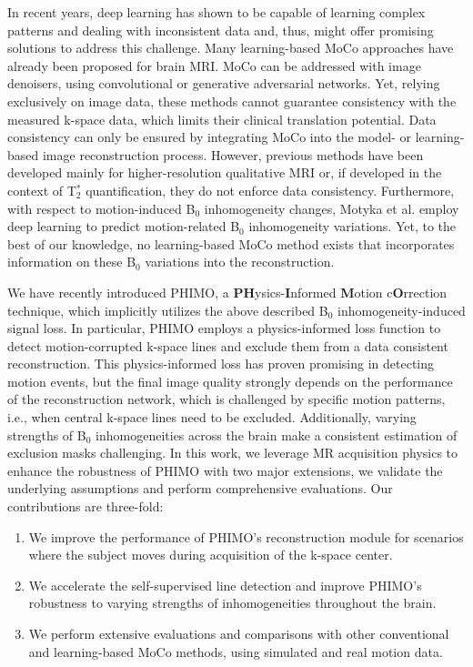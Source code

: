 \documentclass[AMA,STIX2COL]{MRM}
\newcommand{\tstar}[1]{{T$_2^*$}}
\begin{document}
In recent years, deep learning has shown to be capable of learning complex patterns and dealing with inconsistent data and, thus, might offer promising solutions to address this challenge. 
Many learning-based MoCo approaches have already been proposed for brain MRI.\cite{Spieker_2023} MoCo can be addressed with image denoisers, using convolutional \cite{Pirkl_2022,Xu_2022} or generative adversarial networks. \cite{Johnson_2019,Kustner_2019,Oh_2021} Yet, relying exclusively on image data, these methods cannot guarantee consistency with the measured k-space data, which limits their clinical translation potential. Data consistency can only be ensured by integrating MoCo into the model- or learning-based image reconstruction process.\cite{Haskell_2019,Hossbach_2022,Singh_2023,Oksuz_2020} However, previous methods have been developed mainly for higher-resolution qualitative MRI or, if developed in the context of \tstar{} quantification, they do not enforce data consistency.\cite{Xu_2022} Furthermore, with respect to motion-induced B$_0$ inhomogeneity changes, Motyka et al.\cite{Motyka_2024} employ deep learning to predict motion-related B$_0$ inhomogeneity variations. Yet, to the best of our knowledge, no learning-based MoCo method exists that incorporates information on these B$_0$ variations into the reconstruction.

We have recently introduced PHIMO, a \textbf{PH}ysics-\textbf{I}nformed \textbf{M}otion c\textbf{O}rrection technique,\cite{Eichhorn_2024} which implicitly utilizes the above described B$_0$ inhomogeneity-induced signal loss. In particular, PHIMO employs a physics-informed loss function to detect motion-corrupted k-space lines and exclude them from a data consistent reconstruction.
This physics-informed loss has proven promising in detecting motion events, but the final image quality strongly depends on the performance of the reconstruction network, which is challenged by specific motion patterns, i.e., when central k-space lines need to be excluded. Additionally, varying strengths of B$_0$ inhomogeneities across the brain make a consistent estimation of exclusion masks challenging. 
%
In this work, we leverage MR acquisition physics to enhance the robustness of PHIMO with two major extensions, we validate the underlying assumptions and perform comprehensive evaluations. Our contributions are three-fold:
\begin{enumerate}
    \item We improve the performance of PHIMO's reconstruction module for scenarios where the subject moves during acquisition of the k-space center. 
    \item We accelerate the self-supervised line detection and improve PHIMO's robustness to varying strengths of inhomogeneities throughout the brain.
    \item We perform extensive evaluations and comparisons with other conventional and learning-based MoCo methods, using simulated and real motion data. 
\end{enumerate}
\end{document}
